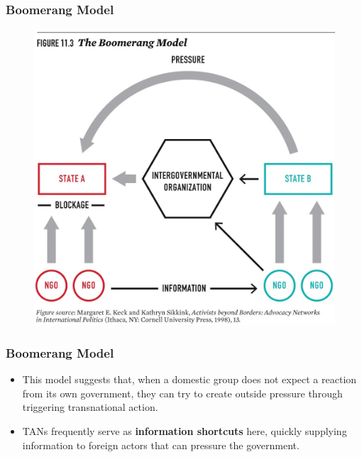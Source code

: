 \documentclass[handout]{beamer}
\begin{document}
\begin{frame} 
	\frametitle{\LARGE{Boomerang Model}}
	\begin{figure}[ht!]
		\centering
		\includegraphics[width=\textwidth,height=0.9\textheight,keepaspectratio]{boomerang.jpg}
	\end{figure}
\end{frame}

\begin{frame} 
	\frametitle{\LARGE{Boomerang Model}}
	\begin{itemize}
		\item This model suggests that, when a domestic group does not expect a reaction from its own government, they can try to create outside pressure through triggering transnational action. \pause
		\item TANs frequently serve as \textbf{information shortcuts} here, quickly supplying information to foreign actors that can pressure the government.
		
	\end{itemize}
\end{frame}
\end{document}
